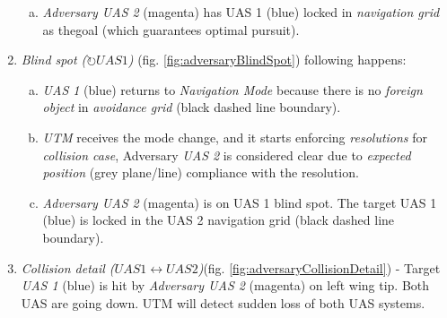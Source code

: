 \begin{enumerate}
\begin{enumerate}[a.]
        \item \emph{Adversary UAS 2} (magenta) has UAS 1 (blue) locked in \emph{navigation grid} as thegoal (which guarantees optimal pursuit).
    \end{enumerate}
    
    \item \emph{Blind spot ($\circlearrowright UAS 1$)} (fig. \ref{fig:adversaryBlindSpot}) following happens:
    \begin{enumerate}[a.]
        \item \emph{UAS 1} (blue) returns to \emph{Navigation Mode} because there is no \emph{foreign object} in \emph{avoidance grid} (black dashed line boundary).
        
        \item \emph{UTM} receives the mode change, and it starts enforcing \emph{resolutions} for \emph{collision case}, Adversary \emph{UAS 2} is considered clear due to \emph{expected position} (grey plane/line) compliance with the resolution.
        
        \item \emph{Adversary UAS 2} (magenta) is on UAS 1 blind spot. The target UAS 1 (blue) is locked in the UAS 2 navigation grid (black dashed line boundary).
    \end{enumerate}
    
    \item \emph{Collision detail ($UAS1\leftrightarrow UAS2$)}(fig. \ref{fig:adversaryCollisionDetail}) - Target \emph{UAS 1} (blue) is hit by \emph{Adversary UAS 2} (magenta) on left wing tip. Both UAS are going down. UTM will detect sudden loss of both UAS systems. 
\end{enumerate}
